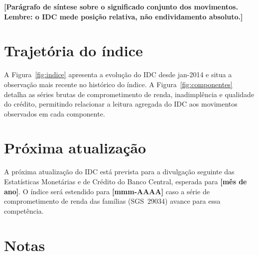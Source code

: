 \documentclass[11pt,a4paper]{article}
\newcommand{\placeholder}[1]{\textcolor{red!70!black}{\textbf{[#1]}}}
\newcommand{\proxdivulgacao}{\placeholder{mês de ano}}              %
\newcommand{\mesproximo}{\placeholder{mmm-AAAA}}                    %
\newcommand{\janelainicio}{jan-2014}   %
\begin{document}
\placeholder{Parágrafo de síntese sobre o significado conjunto dos movimentos.
Lembre: o IDC mede posição relativa, não endividamento absoluto.}


\section{Trajetória do índice}

A Figura~\ref{fig:indice} apresenta a evolução do IDC desde \janelainicio{} e situa a
observação mais recente no histórico do índice. A Figura~\ref{fig:componentes} detalha
as séries brutas de comprometimento de renda, inadimplência e qualidade do crédito,
permitindo relacionar a leitura agregada do IDC aos movimentos observados em cada
componente.
\section{Próxima atualização}

A próxima atualização do IDC está prevista para a divulgação seguinte das Estatísticas
Monetárias e de Crédito do Banco Central, esperada para \proxdivulgacao.
O índice será estendido para \mesproximo{} caso a série de comprometimento de renda das
famílias (SGS~29034) avance para essa competência.

\section*{Notas}

\begingroup\footnotesize
\end{document}
